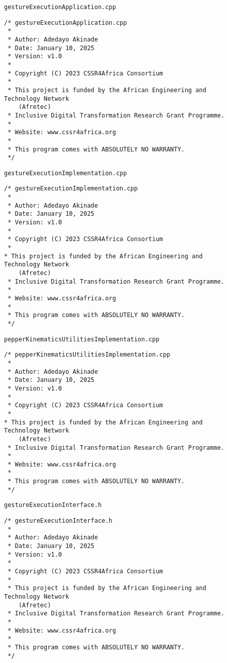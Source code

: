 \documentclass{CSSRforAfrica}
\newcommand{\checkboxChecked}{\fbox{\ding{51}}} %
\begin{document}
\begin{description}

\item[\checkboxChecked] {\small \verb+gestureExecutionApplication.cpp+}  
{\small \begin{verbatim}
/* gestureExecutionApplication.cpp
 *
 * Author: Adedayo Akinade
 * Date: January 10, 2025
 * Version: v1.0
 * 
 * Copyright (C) 2023 CSSR4Africa Consortium
 * 
 * This project is funded by the African Engineering and Technology Network 
    (Afretec) 
 * Inclusive Digital Transformation Research Grant Programme. 
 *
 * Website: www.cssr4africa.org
 *
 * This program comes with ABSOLUTELY NO WARRANTY.
 */
\end{verbatim} }

\newpage
\item[\checkboxChecked]  {\small \verb+gestureExecutionImplementation.cpp+}  
{\small \begin{verbatim}
/* gestureExecutionImplementation.cpp
 *
 * Author: Adedayo Akinade
 * Date: January 10, 2025
 * Version: v1.0
 * 
 * Copyright (C) 2023 CSSR4Africa Consortium
 * 
* This project is funded by the African Engineering and Technology Network 
    (Afretec) 
 * Inclusive Digital Transformation Research Grant Programme. 
 *
 * Website: www.cssr4africa.org
 *
 * This program comes with ABSOLUTELY NO WARRANTY.
 */
\end{verbatim} }

\item[\checkboxChecked]  {\small \verb+pepperKinematicsUtilitiesImplementation.cpp+}  
{\small \begin{verbatim}
/* pepperKinematicsUtilitiesImplementation.cpp
 *
 * Author: Adedayo Akinade
 * Date: January 10, 2025
 * Version: v1.0
 * 
 * Copyright (C) 2023 CSSR4Africa Consortium
 * 
* This project is funded by the African Engineering and Technology Network 
    (Afretec) 
 * Inclusive Digital Transformation Research Grant Programme. 
 *
 * Website: www.cssr4africa.org
 *
 * This program comes with ABSOLUTELY NO WARRANTY.
 */
\end{verbatim} }

\newpage
\item[\checkboxChecked] {\small \verb+gestureExecutionInterface.h+}   
{\small \begin{verbatim}
/* gestureExecutionInterface.h
 *
 * Author: Adedayo Akinade
 * Date: January 10, 2025
 * Version: v1.0
 * 
 * Copyright (C) 2023 CSSR4Africa Consortium
 * 
 * This project is funded by the African Engineering and Technology Network 
    (Afretec) 
 * Inclusive Digital Transformation Research Grant Programme. 
 *
 * Website: www.cssr4africa.org
 *
 * This program comes with ABSOLUTELY NO WARRANTY.
 */
\end{verbatim} }


\end{description}
\end{document}
